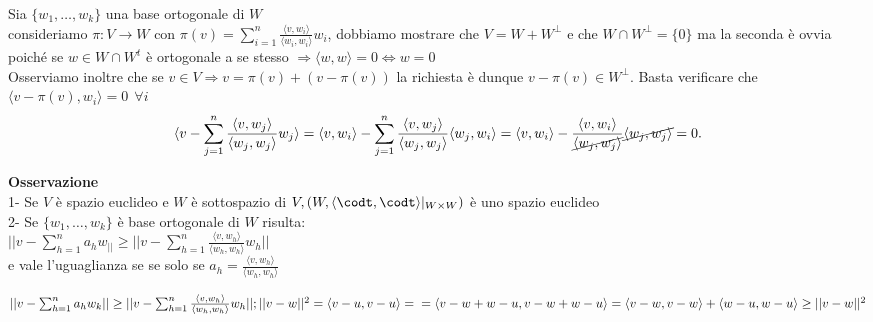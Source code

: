 \documentclass[12px]{article}
\begin{document}
	\begin{dimo}
		Sia $\{w_1,\ldots,w_k\}$ una base ortogonale di $W$ \\ consideriamo $\pi :V \rightarrow W$ con $ \pi(v) = \sum^n_{i=1}\frac{ \langle v, w_i \rangle }{ \langle w_i, w_i \rangle} w_i$, dobbiamo mostrare che $V = W + W^\perp$ e che $W\cap W^\perp = \{0\}$ ma la seconda è ovvia poiché se $w\in W\cap W^t$ è ortogonale a se stesso $ \Rightarrow \langle w, w \rangle = 0 \Leftrightarrow w = 0$\\
		Osserviamo inoltre che se $v\in V \Rightarrow  v = \pi(v) + (v - \pi(v))$ la richiesta è dunque $v - \pi(v)\in W^\perp$. Basta verificare che $ \langle v - \pi(v), w_i \rangle = 0 \ \ \forall i$
		\[
			\langle v - \sum^n_{j=1} \frac{ \langle v, w_j \rangle} {\langle w_j, w_j \rangle} w_j\rangle = \langle v, w_i \rangle  - \sum^n_{j=1} \frac{ \langle v, w_j \rangle }{ \langle w_j, w_j \rangle } \langle w_j, w_i \rangle  = \langle v, w_i \rangle  - \frac{\langle v,w_i\rangle }{\cancel{ \langle w_j, w_j \rangle }} \cancel{\langle w_j, w_j \rangle } =0
		.\]
	\end{dimo}
	\textbf{Osservazione}\\
	1- Se $V$ è spazio euclideo e $W$ è sottospazio di $V, \\(W, \langle \codt, \codt \rangle |_{W\times W})$ è uno spazio euclideo\\
	2- Se $\{w_1,\ldots, w_k\}$ è base ortogonale di $W$ risulta:\\ $|| v- \sum^n_{h=1}a_hw_||\geq||v - \sum^n_{h=1}\frac{ \langle v, w_h \rangle }{ \langle w_h, w_h \rangle} w_h||$ \\e vale l'uguaglianza se se solo se $a_h = \frac{ \langle v, w_h \rangle }{ \langle w_h, w_h \rangle }$
	\begin{dimo}[Punto 2]
		$||v - \sum^n_{h=1}a_hw_k||\geq||v-\sum^n_{h=1}\frac{ \langle v, w_h \rangle }{ \langle w_h, w_h \rangle }w_h||; \\ ||v-w||^2 = \langle v - u, v - u \rangle  =\\= \langle v - w + w - u, v - w + w - u \rangle = \langle v - w, v - w \rangle  + \langle w - u, w - u \rangle \geq ||v-w||^2$
	\end{dimo}
\end{document}
